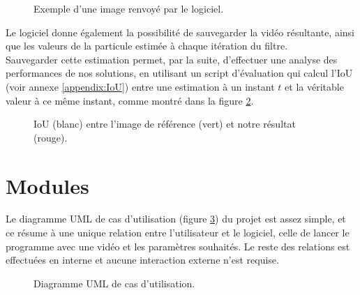 \begin{figure}[!htbp]
\center
\caption{Exemple d'une image renvoyé par le logiciel.}
\label{fig:soft_result}
\end{figure}
\FloatBarrier

Le logiciel donne également la possibilité de sauvegarder la vidéo résultante, ainsi que les valeurs de la particule estimée à chaque itération du filtre.\\
Sauvegarder cette estimation permet, par la suite, d'effectuer une analyse des performances de nos solutions, en utilisant un script d'évaluation qui calcul l'IoU (voir annexe \ref{appendix:IoU}) entre une estimation à un instant $t$ et la véritable valeur à ce même instant, comme montré dans la figure \ref{fig:eval_result}.\\

\begin{figure}[!htbp]
\center
\caption{IoU (blanc) entre l'image de référence (vert) et notre résultat (rouge).}
\label{fig:eval_result}
\end{figure}
\FloatBarrier


\clearpage
\section{Modules}
Le diagramme UML de cas d'utilisation (figure \ref{fig:uml_diagram_usecase}) du projet est assez simple, et ce résume à une unique relation entre l'utilisateur et le logiciel, celle de lancer le programme avec une vidéo et les paramètres souhaités. Le reste des relations est effectuées en interne et aucune interaction externe n'est requise.

\begin{figure}[!htbp]
\center
\caption{Diagramme UML de cas d'utilisation.}
\label{fig:uml_diagram_usecase}
\end{figure}
\FloatBarrier


